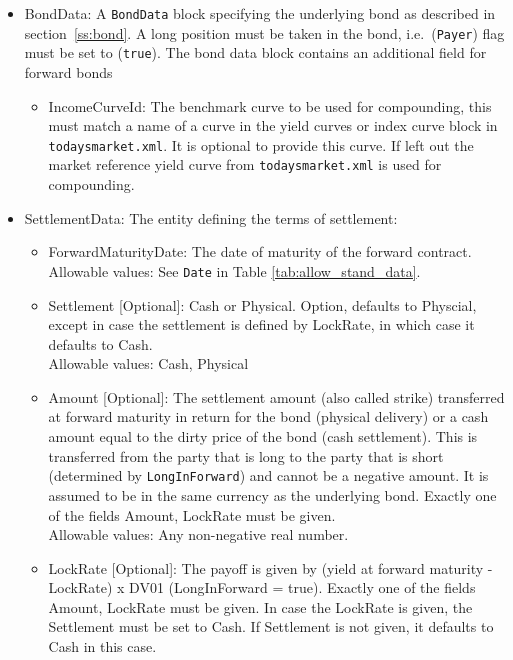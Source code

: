 \begin{itemize}
   \item BondData: A {\tt BondData} block specifying the underlying bond as described in section~\ref{ss:bond}. A long
     position must be taken in the bond, i.e.~({\tt Payer}) flag must be set to ({\tt true}). The bond data block
     contains an additional field for forward bonds
     \begin{itemize}
     \item IncomeCurveId: The benchmark curve to be used for compounding, this must match a name of a curve in the yield
       curves or index curve block in {\tt todaysmarket.xml}. It is optional to provide this curve. If left out the
       market reference yield curve from {\tt todaysmarket.xml} is used for compounding.
     \end{itemize}
   \item SettlementData: The entity defining the terms of settlement:
   \begin{itemize}
       \item ForwardMaturityDate: The date of maturity of the forward contract. \\
         Allowable values: See \lstinline!Date! in Table \ref{tab:allow_stand_data}.
       \item Settlement [Optional]: Cash or Physical. Option, defaults to Physcial, except in case the settlement is
         defined by LockRate, in which case it defaults to Cash. \\
         Allowable values: Cash, Physical
       \item Amount [Optional]: The settlement amount (also called strike) transferred at forward maturity in return for
         the bond (physical delivery) or a cash amount equal to the dirty price of the bond (cash settlement). This is
         transferred from the party that is long to the party that is short (determined by \lstinline!LongInForward!)
         and cannot be a negative amount. It is assumed to be in the same currency as the underlying bond. Exactly one
         of the fields Amount, LockRate must be given. \\
         Allowable values: Any non-negative real number.
       \item LockRate [Optional]: The payoff is given by (yield at forward maturity - LockRate) x DV01 (LongInForward =
         true). Exactly one of the fields Amount, LockRate must be given. In case the LockRate is given, the Settlement
         must be set to Cash. If Settlement is not given, it defaults to Cash in this case. \\

\end{itemize}
\end{itemize}
